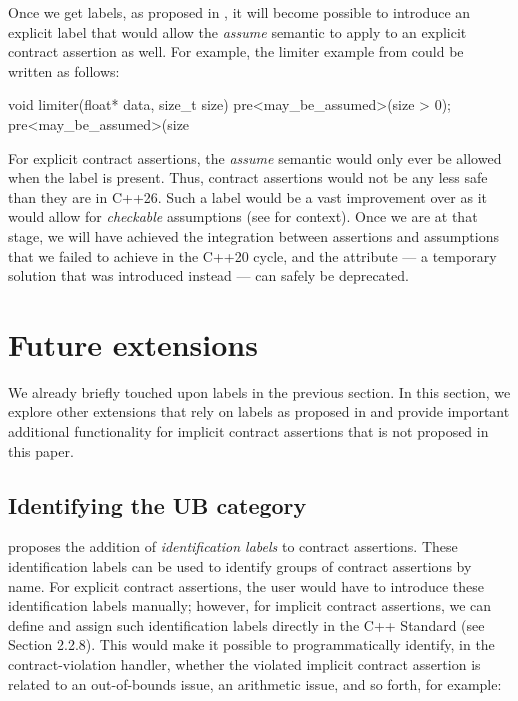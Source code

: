 Once we get labels, as proposed in \cite{P3400R1}, it will become possible to introduce an explicit label that would allow the \emph{assume} semantic to apply to an explicit contract assertion as well. For example, the limiter example from \cite{P1774R8} could be written as follows:
\begin{codeblock}
void limiter(float* data, size_t size)
  pre<may_be_assumed>(size > 0);
  pre<may_be_assumed>(size %
\end{codeblock}
For explicit contract assertions, the \emph{assume} semantic would only ever be allowed when the \mbox{} label is present. Thus, contract assertions would not be any less safe than they are in C++26. Such a label would be a vast improvement over \tcode{[[assume]]} as it would allow for \emph{checkable} assumptions (see \cite{P2064R0} for context). Once we are at that stage, we will have achieved the integration between assertions and assumptions that we failed to achieve in the C++20 cycle, and the \tcode{[[assume]]} attribute --- a temporary solution that was introduced instead --- can safely be deprecated.

\section{Future extensions}
\label{ext}

We already briefly touched upon labels in the previous section. In this section, we explore other extensions that rely on labels as proposed in \cite{P3400R1} and provide important additional functionality for implicit contract assertions that is not proposed in this paper.

\subsection{Identifying the UB category}
\label{idlabels}

\cite{P3400R1} proposes the addition of \emph{identification labels} to contract assertions. These identification labels can be used to identify groups of contract assertions by name. For explicit contract assertions, the user would have to introduce these identification labels manually; however, for implicit contract assertions, we can define and assign such identification labels directly in the C++ Standard (see \cite{P3400R1} Section 2.2.8). This would make it possible to programmatically identify, in the contract-violation handler, whether the violated implicit contract assertion  is related to an out-of-bounds issue, an arithmetic issue, and so forth, for example:

